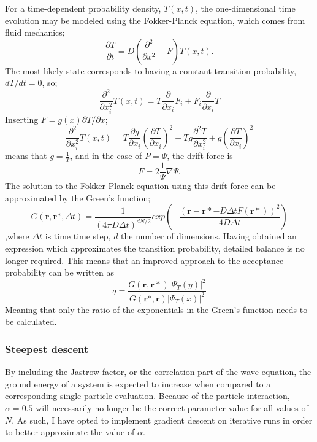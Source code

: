 \documentclass[%
oneside,                 %
final,                   %
10pt]{article}
\begin{document}
For a time-dependent probability density, $T(x,t)$, the one-dimensional time evolution may be modeled using the Fokker-Planck equation, which comes from fluid mechanics;
\begin{equation}
\frac{\partial T}{\partial t} = D (\frac{\partial^2}{\partial x^2}-F) T(x,t).
\end{equation}
The most likely state corresponds to having a constant transition probability, $dT/dt=0$, so; 
\begin{equation}
\frac{\partial^2}{\partial x_i^2} T(x,t) = T \frac{\partial}{\partial x_i} F_i + F_i \frac{\partial }{\partial x_i} T
\end{equation}
Inserting $F= g(x) \partial T/\partial x$;
\begin{equation}
\frac{\partial^2}{\partial x_i^2} T(x,t) = T \frac{\partial g }{\partial x_i}( \frac{\partial T }{\partial x_i})^2  + T g  \frac{\partial^2 T }{\partial x_i^2} + g(\frac{\partial T}{\partial x_i})^2
\end{equation}
means that $g=\frac{1}{T}$, and in the case of $P=\Psi$, the drift force is
\begin{equation}
F=2\frac{1}{\Psi} \nabla \Psi.
\end{equation}
The solution to the Fokker-Planck equation using this drift force can be approximated by the Green's function;
\begin{equation}
G(\bm r,\bm r*,\Delta t) = \frac{1}{(4 \pi D \Delta t)^{dN/2}} exp\left(-\frac{(\bm r-\bm r*-D\Delta t F(\bm r*))^2}{4D\Delta t}\right)
\end{equation}
,where $\Delta t$ is time time step, $d$ the number of dimensions. Having obtained an expression which approximates the transition probability, detailed balance is no longer required. This means that an improved approach to the acceptance probability can be written as
\begin{equation}
q=\frac{G(\bm r,\bm r*)|\Psi_T(y)|^2}{G(\bm r*,\bm r)|\Psi_T(x)|^2}
\end{equation}
Meaning that only the ratio of the exponentials  in the Green's function needs to be calculated.

\subsubsection{Steepest descent} \label{SD}
By including the Jastrow factor, or the correlation part of the wave equation, the ground energy of a system is expected to increase when compared to a corresponding single-particle evaluation. Because of the particle interaction, $\alpha=0.5$ will necessarily no longer be the correct parameter value for all values of $N$. As such, I have opted to implement gradient descent on iterative runs in order to better approximate the value of $\alpha$.
\end{document}
